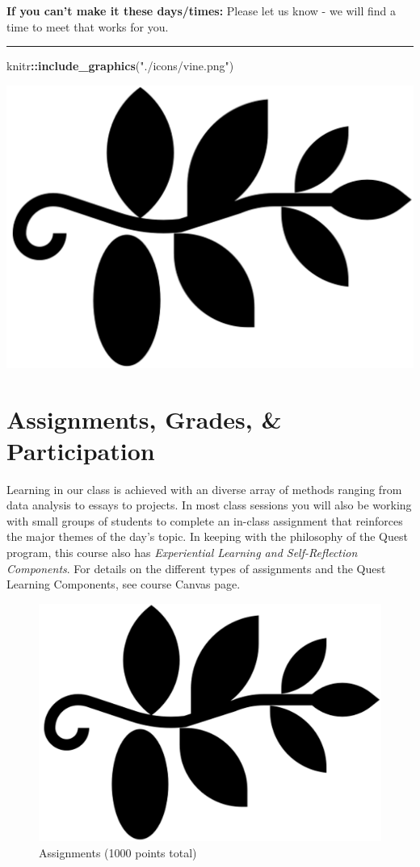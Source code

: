 \documentclass[
  12pt,
]{article}
\newenvironment{Shaded}{\begin{snugshade}}{\end{snugshade}}
\newcommand{\FunctionTok}[1]{\textcolor[rgb]{0.13,0.29,0.53}{\textbf{#1}}}
\newcommand{\NormalTok}[1]{#1}
\newcommand{\SpecialCharTok}[1]{\textcolor[rgb]{0.81,0.36,0.00}{\textbf{#1}}}
\newcommand{\StringTok}[1]{\textcolor[rgb]{0.31,0.60,0.02}{#1}}
\begin{document}
\textbf{If you can't make it these days/times:} Please let us know - we
will find a time to meet that works for you.

\begin{center}\rule{0.5\linewidth}{0.5pt}\end{center}

\vspace{-0.7cm}

\begin{Shaded}
\begin{Highlighting}[]
\NormalTok{knitr}\SpecialCharTok{::}\FunctionTok{include\_graphics}\NormalTok{(}\StringTok{"./icons/vine.png"}\NormalTok{)}
\end{Highlighting}
\end{Shaded}

\includegraphics[width=0.1\linewidth]{./icons/vine}

\section{Assignments, Grades, \&
Participation}\label{assignments-grades-participation}

\vspace{0.3cm}

Learning in our class is achieved with an diverse array of methods
ranging from data analysis to essays to projects. In most class sessions
you will also be working with small groups of students to complete an
in-class assignment that reinforces the major themes of the day's topic.
In keeping with the philosophy of the Quest program, this course also
has \emph{Experiential Learning and Self-Reflection Components}. For
details on the different types of assignments and the Quest Learning
Components, see course Canvas page.

\vspace{0.1cm}

\begin{figure}

\includegraphics[width=0.03\linewidth]{./icons/vine} \hfill{}

\caption{Assignments (1000 points total)}\label{fig:grading}
\end{figure}

\vspace{-0.5cm}
\end{document}
